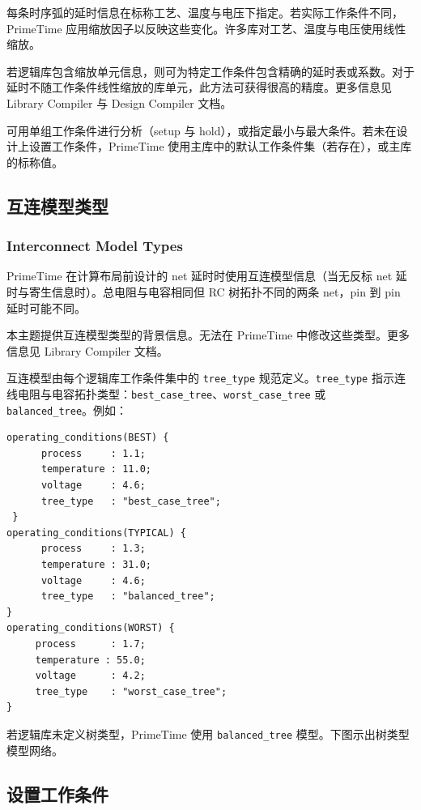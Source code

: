 每条时序弧的延时信息在标称工艺、温度与电压下指定。若实际工作条件不同，PrimeTime 应用缩放因子以反映这些变化。许多库对工艺、温度与电压使用线性缩放。

若逻辑库包含缩放单元信息，则可为特定工作条件包含精确的延时表或系数。对于延时不随工作条件线性缩放的库单元，此方法可获得很高的精度。更多信息见 Library Compiler 与 Design Compiler 文档。

可用单组工作条件进行分析（setup 与 hold），或指定最小与最大条件。若未在设计上设置工作条件，PrimeTime 使用主库中的默认工作条件集（若存在），或主库的标称值。

\subsection{互连模型类型}
\subsubsection*{Interconnect Model Types}

PrimeTime 在计算布局前设计的 net 延时时使用互连模型信息（当无反标 net 延时与寄生信息时）。总电阻与电容相同但 RC 树拓扑不同的两条 net，pin 到 pin 延时可能不同。

本主题提供互连模型类型的背景信息。无法在 PrimeTime 中修改这些类型。更多信息见 Library Compiler 文档。

互连模型由每个逻辑库工作条件集中的 \texttt{tree\_type} 规范定义。\texttt{tree\_type} 指示连线电阻与电容拓扑类型：\texttt{best\_case\_tree}、\texttt{worst\_case\_tree} 或 \texttt{balanced\_tree}。例如：
\begin{lstlisting}
operating_conditions(BEST) {
      process     : 1.1;
      temperature : 11.0;
      voltage     : 4.6;
      tree_type   : "best_case_tree";
 }
operating_conditions(TYPICAL) {
      process     : 1.3;
      temperature : 31.0;
      voltage     : 4.6;
      tree_type   : "balanced_tree";
}
operating_conditions(WORST) {
     process      : 1.7;
     temperature : 55.0;
     voltage      : 4.2;
     tree_type    : "worst_case_tree";
}
\end{lstlisting}

若逻辑库未定义树类型，PrimeTime 使用 \texttt{balanced\_tree} 模型。下图示出树类型模型网络。


\subsection{设置工作条件}
